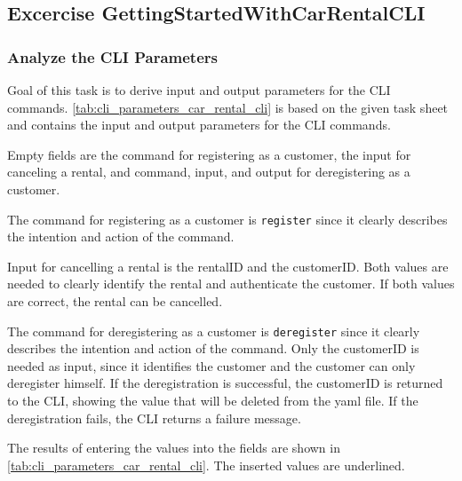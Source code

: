 \subsection{Excercise GettingStartedWithCarRentalCLI}
\label{sec:exercise_getting_started_with_car_rental_cli}
\subsubsection*{Analyze the CLI Parameters}
Goal of this task is to derive input and output parameters for the CLI commands.
\autoref{tab:cli_parameters_car_rental_cli} is based on the given task sheet and contains the input and output parameters for the CLI commands.

Empty fields are the command for registering as a customer, the input for canceling a rental, and command, input, and output for deregistering as a customer.

The command for registering as a customer is \texttt{register} since it clearly describes the intention and action of the command.

Input for cancelling a rental is the rentalID and the customerID.
Both values are needed to clearly identify the rental and authenticate the customer.
If both values are correct, the rental can be cancelled.

The command for deregistering as a customer is \texttt{deregister} since it clearly describes the intention and action of the command.
Only the customerID is needed as input, since it identifies the customer and the customer can only deregister himself.
If the deregistration is successful, the customerID is returned to the CLI, showing the value that will be deleted from the yaml file.
If the deregistration fails, the CLI returns a failure message.

The results of entering the values into the fields are shown in \autoref{tab:cli_parameters_car_rental_cli}.
The inserted values are underlined.

